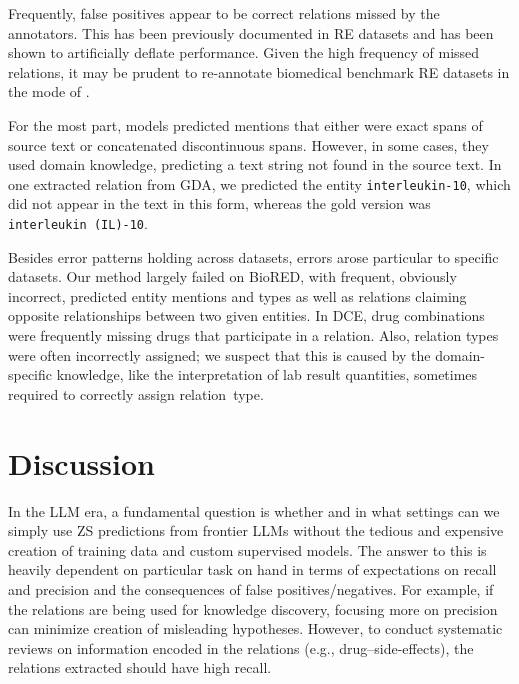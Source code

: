\documentclass[11pt]{article}
\begin{document}
Frequently, false positives appear to be correct relations missed by the annotators.  This has been previously documented in RE datasets \cite{tran2019neural, tan2023revisiting} and has been shown to artificially  deflate performance. Given the high frequency of missed relations, it may be prudent to re-annotate biomedical benchmark RE datasets in the mode of \citet{tan2023revisiting}.

For the most part,  models predicted mentions that either were exact spans of source text or concatenated discontinuous spans.  However, in some cases, they used domain knowledge, predicting a text string not found in the source text.  In one extracted relation from GDA, we predicted the entity \texttt{interleukin-10}, which did not appear in the text in this form, whereas the gold version was \texttt{interleukin (IL)-10}.  

Besides error patterns holding across datasets, errors arose particular to specific datasets.  Our method largely failed on BioRED, with frequent, obviously incorrect, predicted entity mentions and types as well as relations claiming opposite relationships between two given entities.  In DCE, drug combinations were frequently missing drugs that participate in a relation.  Also, relation types were often incorrectly assigned; we suspect that this is caused by the domain-specific knowledge, like the interpretation of lab result quantities, sometimes required to correctly assign relation~type.

\section{Discussion}
\label{sec-disc}
In the LLM era, a fundamental question is whether and in what settings can we simply use ZS predictions from frontier LLMs without the tedious and expensive creation of training data and custom supervised models. The answer to this is heavily dependent on particular task on hand in terms of expectations on recall and precision and the consequences of false positives/negatives. For example, if the relations are being used for knowledge discovery, focusing more on precision can minimize creation of misleading hypotheses. However, to conduct systematic reviews on information encoded in the relations (e.g., drug--side-effects), the relations extracted should have high recall. 
\end{document}

